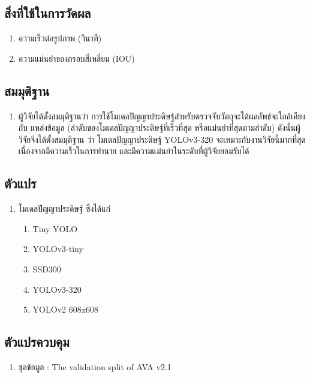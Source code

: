 \subsection*{สิ่งที่ใช้ในการวัดผล}
	\begin{enumerate}
		\item ความเร็วต่อรูปภาพ (วินาที)
		\item ความแม่นยำของกรอบสี่เหลี่ยม (IOU)
	\end{enumerate}
\subsection*{สมมุติฐาน}
	\begin{enumerate}
		\item ผู้วิจัยได้ตั้งสมมุติฐานว่า การใช้โมเดลปัญญาประดิษฐ์สำหรับตรวจจับวัตถุจะได้ผลลัพธ์จะใกล้เคียงกับ
		แหล่งข้อมูล (ลำดับของโมเดลปัญญาประดิษฐ์ที่เร็วที่สุด หรือแม่นยำที่สุดตามลำดับ) ดังนั้นผู้วิจัยจึงได้ตั้งสมมุติฐาน
		ว่า โมเดลปัญญาประดิษฐ์ YOLOv3-320 จะเหมาะกับงานวิจัยนี้มากที่สุด เนื่องจากมีความเร็วในการทำนาย
		และมีความแม่นยำในระดับที่ผู้วิจัยยอมรับได้
	\end{enumerate}
\subsection*{ตัวแปร}
	\begin{enumerate}
		\item โมเดลปัญญาประดิษฐ์ ซึ่งได้แก่
		\begin{enumerate}
			\item Tiny YOLO
			\item YOLOv3-tiny
			\item SSD300	
			\item YOLOv3-320
			\item YOLOv2 608x608
		\end{enumerate}
	\end{enumerate}
\subsection*{ตัวแปรควบคุม}
	\begin{enumerate}
		\item ชุดข้อมูล : The validation split of AVA v2.1
	\end{enumerate}
